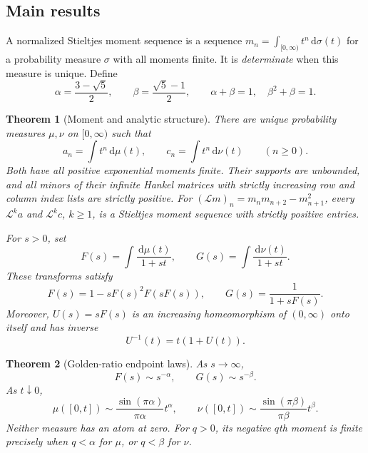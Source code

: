 \documentclass[11pt]{article}
\numberwithin{equation}{section}
\newtheorem{theorem}{Theorem}[section]
\theoremstyle{definition}
\theoremstyle{remark}
\newcommand{\dd}{\,\mathrm d}
\newcommand{\LL}{\mathcal L}
\begin{document}
\subsection{Main results}
A normalized Stieltjes moment sequence is a sequence
$m_n=\int_{[0,\infty)}t^n\dd\sigma(t)$ for a probability measure $\sigma$
with all moments finite. It is \emph{determinate} when this measure is unique.
Define
\begin{equation}\label{gml:eq:exponents}
 \alpha=\frac{3-\sqrt5}{2},\qquad
 \beta=\frac{\sqrt5-1}{2},\qquad
 \alpha+\beta=1,\quad\beta^2+\beta=1.
\end{equation}

\begin{theorem}[Moment and analytic structure]\label{gml:thm:mainmoment}
There are unique probability measures $\mu,\nu$ on $[0,\infty)$ such that
\begin{equation}\label{gml:eq:moments}
 a_n=\int t^n\dd\mu(t),\qquad c_n=\int t^n\dd\nu(t)\qquad(n\ge0).
\end{equation}
Both have all positive exponential moments finite. Their supports are
unbounded, and all minors of their infinite Hankel matrices with strictly
increasing row and column index lists are strictly positive. For
$(\LL m)_n=m_nm_{n+2}-m_{n+1}^2$, every $\LL^k a$ and $\LL^k c$, $k\ge1$,
is a Stieltjes moment sequence with strictly positive entries.

For $s>0$, set
\begin{equation}\label{gml:eq:FG}
 F(s)=\int\frac{\dd\mu(t)}{1+st},\qquad
 G(s)=\int\frac{\dd\nu(t)}{1+st}.
\end{equation}
These transforms satisfy
\begin{equation}\label{gml:eq:functions}
 F(s)=1-sF(s)^2F(sF(s)),\qquad G(s)=\frac1{1+sF(s)}.
\end{equation}
Moreover, $U(s)=sF(s)$ is an increasing homeomorphism of $(0,\infty)$ onto
itself and has inverse
\begin{equation}\label{gml:eq:Uinverse}
 U^{-1}(t)=t(1+U(t)).
\end{equation}
\end{theorem}

\begin{theorem}[Golden-ratio endpoint laws]\label{gml:thm:mainendpoint}
As $s\to\infty$,
\begin{equation}\label{gml:eq:transformpower}
 F(s)\sim s^{-\alpha},\qquad G(s)\sim s^{-\beta}.
\end{equation}
As $t\downarrow0$,
\begin{equation}\label{gml:eq:CDF}
 \mu([0,t])\sim\frac{\sin(\pi\alpha)}{\pi\alpha}t^\alpha,
 \qquad
 \nu([0,t])\sim\frac{\sin(\pi\beta)}{\pi\beta}t^\beta.
\end{equation}
Neither measure has an atom at zero. For $q>0$, its negative $q$th moment
is finite precisely when $q<\alpha$ for $\mu$, or $q<\beta$ for $\nu$.
\end{theorem}
\end{document}
